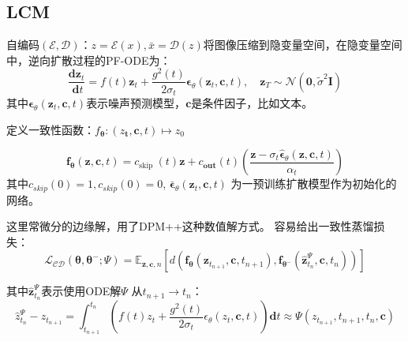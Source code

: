\documentclass[lang=cn,newtx,10pt,scheme=chinese]{elegantbook}
\begin{document}
\subsection{LCM}
自编码$(\mathcal{E}, \mathcal{D})$：$z=\mathcal{E}(x), \bar{x}=\mathcal{D}(z)$将图像压缩到隐变量空间，在隐变量空间中，逆向扩散过程的PF-ODE为：
\begin{equation}
\frac{\mathbf{d} \boldsymbol{z}_t}{\mathbf{~d} t}=f(t) \boldsymbol{z}_t+\frac{g^2(t)}{2 \sigma_t} \boldsymbol{\epsilon}_\theta\left(\boldsymbol{z}_t, \boldsymbol{c}, t\right), \quad \boldsymbol{z}_T \sim \mathcal{N}\left(\mathbf{0}, \tilde{\sigma}^2 \boldsymbol{I}\right)
\end{equation}
其中$\boldsymbol{\epsilon}_\theta\left(\boldsymbol{z}_t, \boldsymbol{c}, t\right)$表示噪声预测模型，$\boldsymbol{c}$是条件因子，比如文本。

定义一致性函数：$f_{\boldsymbol{\theta}}:\left(z_{\boldsymbol{t}}, \boldsymbol{c}, t\right) \mapsto z_0$

\begin{equation}
\boldsymbol{f}_{\boldsymbol{\theta}}(\boldsymbol{z}, \boldsymbol{c}, t)=c_{\text {skip }}(t) \boldsymbol{z}+c_{\mathbf{out}}(t)\left(\frac{\boldsymbol{z}-\sigma_t \hat{\boldsymbol{\epsilon}}_\theta(\boldsymbol{z}, \boldsymbol{c}, t)}{\alpha_t}\right)
\end{equation}
其中$c_{skip}(0)=1, c_{skip}(0)=0$, $\boldsymbol{\bar{\epsilon}}_\theta\left(\boldsymbol{z}_t, \boldsymbol{c}, t\right)$ 为一预训练扩散模型作为初始化的网络。

这里常微分的边缘解，用了DPM++这种数值解方式。
容易给出一致性蒸馏损失：
\begin{equation}
\mathcal{L}_{\mathcal{C D}}\left(\boldsymbol{\theta}, \boldsymbol{\theta}^{-} ; \Psi\right)=\mathbb{E}_{\boldsymbol{z}, \boldsymbol{c}, n}\left[d\left(\boldsymbol{f}_{\boldsymbol{\theta}}\left(\boldsymbol{z}_{t_{n+1}}, \boldsymbol{c}, t_{n+1}\right), \boldsymbol{f}_{\boldsymbol{\theta}^{-}}\left(\hat{\boldsymbol{z}}_{t_n}^{\Psi}, \boldsymbol{c}, t_n\right)\right)\right]
\end{equation}

其中$\hat{\boldsymbol{z}}_{t_n}^{\Psi}$表示使用ODE解$\Psi$ 从$t_{n+1} \rightarrow t_n$：
\begin{equation}
\hat{z}_{t_n}^{\Psi}-z_{t_{n+1}}=\int_{t_{n+1}}^{t_n}\left(f(t) z_t+\frac{g^2(t)}{2 \sigma_t} \epsilon_\theta\left(z_t, \boldsymbol{c}, t\right)\right) \mathbf{d} t \approx \Psi\left(z_{t_{n+1}}, t_{n+1}, t_n, \boldsymbol{c}\right)
\end{equation}
\end{document}
